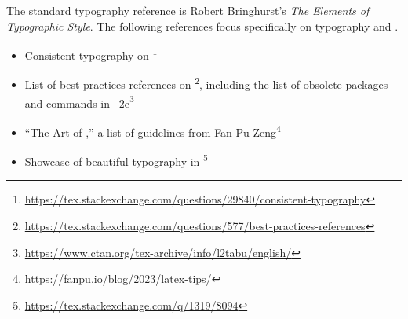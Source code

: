 The standard typography reference is Robert Bringhurst's \emph{The Elements of Typographic Style}. 
The following references focus specifically on typography and \LaTeXx.
\begin{itemize}
    \item Consistent typography on \footnote{\url{https://tex.stackexchange.com/questions/29840/consistent-typography}}
    \item List of best practices references on \footnote{\url{https://tex.stackexchange.com/questions/577/best-practices-references}}, including the list of obsolete packages and commands in \LaTeXx~2e\footnote{\url{https://www.ctan.org/tex-archive/info/l2tabu/english/}}
    \item ``The Art of \LaTeXx,'' a list of guidelines from Fan Pu Zeng\footnote{\url{https://fanpu.io/blog/2023/latex-tips/}}
    \item Showcase of beautiful typography in \LaTeXx\footnote{\url{https://tex.stackexchange.com/q/1319/8094}}
\end{itemize}

